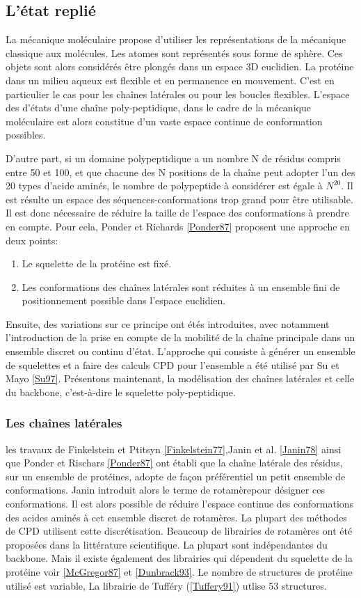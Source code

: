 \subsection{L'état replié }
La mécanique moléculaire propose d'utiliser les représentations de la mécanique classique aux molécules. Les atomes sont représentés sous forme de sphère. Ces objets sont alors considérés être plongés dans un espace 3D euclidien.
La protéine dans un milieu aqueux est flexible et en permanence en mouvement. C'est en particulier le cas pour les chaînes latérales ou pour les boucles flexibles. L'espace des d'états d'une chaîne poly-peptidique, dans le cadre de la mécanique moléculaire est alors constitue d'un vaste espace continue de conformation possibles.

D'autre part, si un domaine polypeptidique a un nombre N de résidus compris entre 50 et 100, et que chacune des N positions de la chaîne peut adopter l'un des 20 types d'acide aminés, le nombre de polypeptide à considérer est égale à  $N^{20}$. Il est résulte un espace des séquences-conformations trop grand pour être utilisable. Il est donc nécessaire de réduire la taille de l'espace des conformations à prendre en compte. Pour cela, Ponder et Richards \ref{Ponder87} proposent une approche en deux points:
\begin{enumerate}
\item Le squelette de la protéine est fixé.
\item Les conformations des chaînes latérales sont réduites à un ensemble fini de positionnement possible dans l'espace euclidien.
\end{enumerate}  
Ensuite, des variations sur ce principe ont étés introduites, avec notamment l'introduction de la prise en compte de la mobilité de la chaîne principale dans un ensemble discret ou continu d'état. L'approche qui consiste à générer un ensemble de squelettes et a faire des calculs CPD pour l'ensemble a été utilisé par Su et Mayo \ref{Su97}. 
Présentons maintenant, la modélisation des chaînes latérales et celle du backbone, c'est-à-dire le squelette poly-peptidique.

\subsubsection{Les chaînes latérales}

les travaux de Finkelstein et Ptitsyn \ref{Finkelstein77},Janin et al. \ref{Janin78} ainsi que Ponder et Rischars \ref{Ponder87} ont établi que la chaîne latérale des résidus, sur un ensemble de protéines, adopte de façon préférentiel un petit ensemble de conformations. Janin introduit alors le terme de \og rotamère\fg pour désigner ces conformations. Il est alors possible de réduire l'espace continue des conformations des acides aminés à cet ensemble discret de rotamères. La plupart des méthodes de CPD utilisent cette discrétisation. Beaucoup de librairies de rotamères ont été proposées dans la littérature scientifique. La plupart sont indépendantes du backbone. Mais il existe également des librairies qui dépendent du squelette de la protéine voir \ref{McGregor87} et \ref{Dunbrack93}. Le nombre de structures de protéine utilisé est variable, La librairie de Tufféry (\ref{Tuffery91}) utlise 53 structures. 

